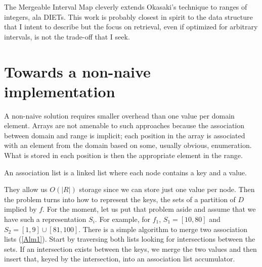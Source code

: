\documentclass{article}
\begin{document}
The Mergeable Interval Map\cite{Bonichon2010} cleverly extends Okasaki's
technique to ranges of integers, ala DIETs.
This work is probably closest in spirit to the
data structure that I intent to describe but the focus on retrieval,
even if optimized for arbitrary intervals,
is not the trade-off that I seek.

\section{Towards a non-naive implementation}

A non-naive solution requires smaller overhead than one value per domain element.
Arrays are not amenable to such approaches
because the association between domain and range is implicit;
each position in the array is associated with an element from the domain
based on some, usually obvious, enumeration.
What is stored in each position is then the appropriate element in the range.

\begin{comment}
We could store only the range elements in an array,
but that would just transfer the difficulty of the problem into
figuring out how to index into such an array.

\end{comment}

An association list is a linked list where each node contains a key and a value.
\begin{comment}
For our purposes, they highlight how to separate two concerns necessary for
our representation.
\end{comment}
They allow us $O(|R|)$ storage since we can store just one value per node.
Then the problem turns into how to represent the keys,
the sets of a partition of $D$ implied by $f$.
For the moment,
let us put that problem aside and assume that we have such a representation
$S_{i}$.
For example, for $f_{1}$, $S_{1} = [10,80]$ and $S_{2} = [1,9]\cup[81,100]$.
There is a simple algorithm to merge two association lists (\ref{Alm1}).
Start by traversing both lists looking for intersections between the sets.
If an intersection exists between the keys,
we merge the two values and then insert that,
keyed by the intersection,
into an association list accumulator.
\end{document}
